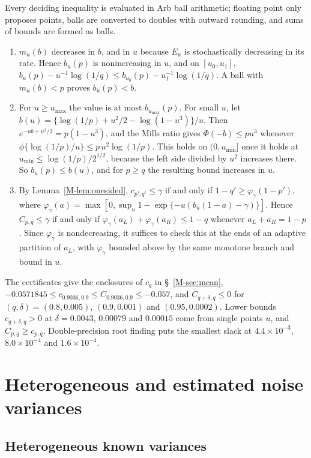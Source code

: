 \documentclass[11pt]{article}
\begin{document}
Every deciding inequality is evaluated in Arb ball arithmetic; floating point only proposes points, balls are converted to doubles with outward rounding, and sums of bounds are formed as balls.
\begin{enumerate}
\item $m_u(b)$ decreases in $b$, and in $u$ because $E_u$ is stochastically decreasing in its rate. Hence $b_u(p)$ is nonincreasing in $u$, and on $[u_0, u_1]$, $b_u(p) - u^{-1}\log(1/q) \le b_{u_0}(p) - u_1^{-1}\log(1/q)$. A ball with $m_u(b) < p$ proves $b_u(p) < b$.
\item For $u \ge u_{\max}$ the value is at most $b_{u_{\max}}(p)$. For small $u$, let $b(u) = \{\log(1/p) + u^2/2 - \log(1 - u^3)\}/u$. Then $e^{-ub + u^2/2} = p(1 - u^3)$, and the Mills ratio gives $\Phi(-b) \le pu^3$ whenever $\phi\{\log(1/p)/u\} \le p\,u^2\log(1/p)$. This holds on $(0, u_{\min}]$ once it holds at $u_{\min} \le \log(1/p)/2^{1/2}$, because the left side divided by $u^2$ increases there. So $b_u(p) \le b(u)$, and for $p \ge q$ the resulting bound increases in $u$.
\item By Lemma~\ref{M-lem:onesided}, $c_{p',q'} \le \gamma$ if and only if $1 - q' \ge \varphi_\gamma(1 - p')$, where $\varphi_\gamma(a) = \max[0, \sup_u 1 - \exp\{-u(b_u(1-a) - \gamma)\}]$. Hence $C_{p,q} \le \gamma$ if and only if $\varphi_\gamma(a_L) + \varphi_\gamma(a_R) \le 1 - q$ whenever $a_L + a_R = 1 - p$. Since $\varphi_\gamma$ is nondecreasing, it suffices to check this at the ends of an adaptive partition of $a_L$, with $\varphi_\gamma$ bounded above by the same monotone branch and bound in $u$.
\end{enumerate}
The certificates give the enclosures of $c_q$ in \S~\ref{M-sec:mean}, $-0.0571845 \le c_{0.9036,0.9} \le C_{0.9036,0.9} \le -0.057$, and $C_{q+\delta,q} \le 0$ for $(q, \delta) = (0.8, 0.005)$, $(0.9, 0.001)$ and $(0.95, 0.0002)$. Lower bounds $c_{q+\delta,q} > 0$ at $\delta = 0.0043$, $0.00079$ and $0.00015$ come from single points $u$, and $C_{p,q} \ge c_{p,q}$. Double-precision root finding puts the smallest slack at $4.4\times10^{-3}$, $8.0\times10^{-4}$ and $1.6\times10^{-4}$.

\section{Heterogeneous and estimated noise variances}\label{sec:s-hetero}

\subsection*{Heterogeneous known variances}
\end{document}
